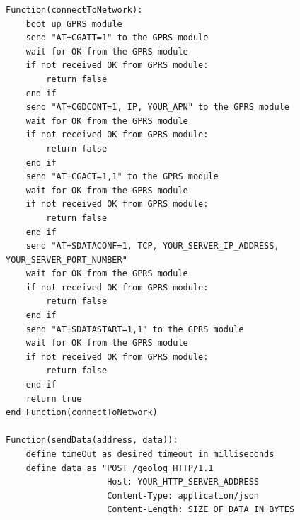 \begin{lstlisting}[frame=single, label=pseodoGprsGateway, caption={Pseudocode of GprsGateway connectToNetwork() and sendData() functions}]
Function(connectToNetwork):
    boot up GPRS module
    send "AT+CGATT=1" to the GPRS module
    wait for OK from the GPRS module
    if not received OK from GPRS module:
        return false
    end if
    send "AT+CGDCONT=1, IP, YOUR_APN" to the GPRS module
    wait for OK from the GPRS module
    if not received OK from GPRS module:
        return false
    end if
    send "AT+CGACT=1,1" to the GPRS module
    wait for OK from the GPRS module
    if not received OK from GPRS module:
        return false
    end if
    send "AT+SDATACONF=1, TCP, YOUR_SERVER_IP_ADDRESS, YOUR_SERVER_PORT_NUMBER"
    wait for OK from the GPRS module
    if not received OK from GPRS module:
        return false
    end if
    send "AT+SDATASTART=1,1" to the GPRS module
    wait for OK from the GPRS module
    if not received OK from GPRS module:
        return false
    end if
    return true
end Function(connectToNetwork)

Function(sendData(address, data)):
    define timeOut as desired timeout in milliseconds
    define data as "POST /geolog HTTP/1.1
                    Host: YOUR_HTTP_SERVER_ADDRESS
                    Content-Type: application/json
                    Content-Length: SIZE_OF_DATA_IN_BYTES


\end{lstlisting}
